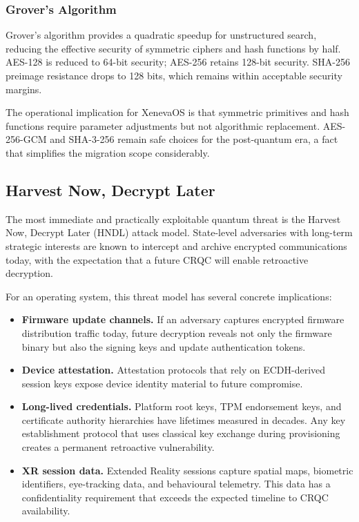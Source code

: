 \documentclass[11pt, a4paper]{article}
\begin{document}
\subsubsection{Grover's Algorithm}

Grover's algorithm provides a quadratic speedup for unstructured search, reducing the effective security of symmetric ciphers and hash functions by half. AES-128 is reduced to 64-bit security; AES-256 retains 128-bit security. SHA-256 preimage resistance drops to 128 bits, which remains within acceptable security margins.

The operational implication for XenevaOS is that symmetric primitives and hash functions require parameter adjustments but not algorithmic replacement. AES-256-GCM and SHA-3-256 remain safe choices for the post-quantum era, a fact that simplifies the migration scope considerably.

\subsection{Harvest Now, Decrypt Later}\label{sec:hndl}

The most immediate and practically exploitable quantum threat is the Harvest Now, Decrypt Later (HNDL) attack model. State-level adversaries with long-term strategic interests are known to intercept and archive encrypted communications today, with the expectation that a future CRQC will enable retroactive decryption.

For an operating system, this threat model has several concrete implications:

\begin{itemize}
    \item \textbf{Firmware update channels.} If an adversary captures encrypted firmware distribution traffic today, future decryption reveals not only the firmware binary but also the signing keys and update authentication tokens.
    \item \textbf{Device attestation.} Attestation protocols that rely on ECDH-derived session keys expose device identity material to future compromise.
    \item \textbf{Long-lived credentials.} Platform root keys, TPM endorsement keys, and certificate authority hierarchies have lifetimes measured in decades. Any key establishment protocol that uses classical key exchange during provisioning creates a permanent retroactive vulnerability.
    \item \textbf{XR session data.} Extended Reality sessions capture spatial maps, biometric identifiers, eye-tracking data, and behavioural telemetry. This data has a confidentiality requirement that exceeds the expected timeline to CRQC availability.
\end{itemize}
\end{document}
